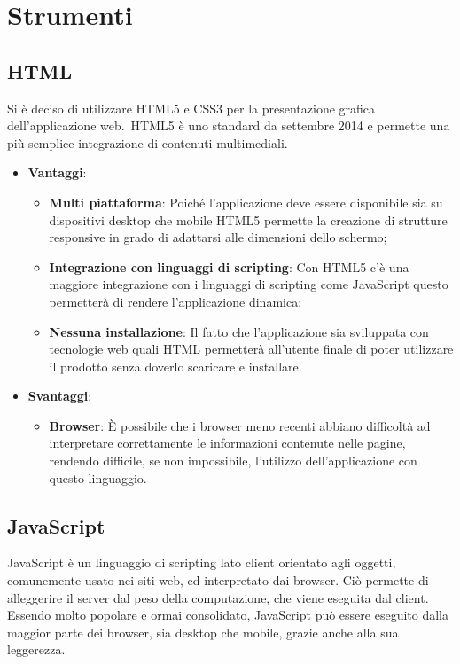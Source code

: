 \section{Strumenti}
	\subsection{HTML}{
		Si è deciso di utilizzare HTML5 e CSS3 per la presentazione grafica dell'applicazione web.\
		HTML5 è uno standard da settembre 2014 e permette una più semplice integrazione di contenuti multimediali.
	
		\begin{itemize}
			\item \textbf{Vantaggi}: 
			\begin{itemize}
				\item \textbf{Multi piattaforma}: Poiché l'applicazione deve essere disponibile sia su dispositivi desktop che mobile HTML5 permette la creazione di strutture responsive in grado di adattarsi alle dimensioni dello schermo;
				\item \textbf{Integrazione con linguaggi di scripting}: Con HTML5 c'è una maggiore integrazione con i linguaggi di scripting come JavaScript questo permetterà di rendere l'applicazione dinamica;
				\item \textbf{Nessuna installazione}: Il fatto che l'applicazione sia sviluppata con tecnologie web quali HTML permetterà all'utente finale di poter utilizzare il prodotto senza doverlo scaricare e installare.
			\end{itemize}
			\item \textbf{Svantaggi}:
			\begin{itemize}
				\item \textbf{Browser}: È possibile che i browser meno recenti abbiano difficoltà ad interpretare correttamente le informazioni contenute nelle pagine, rendendo difficile, se non impossibile, l'utilizzo dell'applicazione con questo linguaggio.
			\end{itemize}
		\end{itemize}
		}
	\subsection{JavaScript}{
		JavaScript è un linguaggio di scripting lato client orientato agli oggetti, comunemente usato nei siti web, ed interpretato dai browser. Ciò permette di alleggerire il server dal peso della computazione, che viene eseguita dal client. Essendo molto popolare e ormai consolidato, JavaScript può essere eseguito dalla maggior parte dei browser, sia desktop che mobile, grazie anche alla sua leggerezza. 		}
